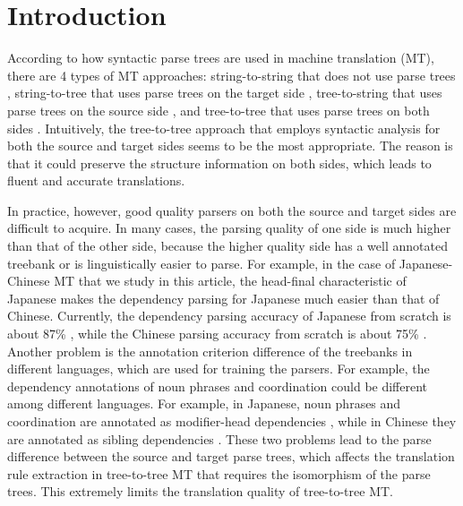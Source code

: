 \documentclass[english]{jnlp_1.4}
\begin{document}
\maketitle

\vspace*{-1.5\Cvs}
\section{Introduction}

According to how syntactic parse trees are used in machine translation (MT), there are 4 types of
MT approaches: string-to-string that does not use parse trees \cite{chiang:2005:ACL,koehn-EtAl:2007:PosterDemo}, 
string-to-tree that uses parse trees on the target side \cite{galley-EtAl:2006:COLACL,shen-xu-weischedel:2008:ACLMain},
tree-to-string that uses parse trees on the source side 
\cite{quirk-menezes-cherry:2005:ACL,liu-liu-lin:2006:COLACL,mi-huang:2008:EMNLP},
and tree-to-tree that uses parse trees on both sides \cite{zhang-EtAl:2008:ACLMain3,richardson-EtAl:2015:WAT}.
Intuitively, the tree-to-tree approach that employs syntactic analysis for both the source 
and target sides seems to be the most appropriate. The reason is that it could preserve 
the structure information on both sides, 
\pagebreak
which leads to fluent and accurate translations.

In practice, however, good quality parsers on both the source and target sides are difficult to 
acquire. In many cases, the parsing quality of one side is much higher than that of the other 
side, because the higher quality side has a well annotated treebank or is linguistically easier to parse. 
For example, in the case of Japanese-Chinese MT that we study in this article, 
the head-final characteristic of Japanese \cite{isozaki-EtAl:2010:WMT} makes the dependency
parsing for Japanese much easier than that of Chinese. Currently, the dependency 
parsing accuracy of Japanese {from scratch is about 87\%} \cite{kawahara-kurohashi:2006:HLT-NAACL06-Main},
while the Chinese parsing accuracy {from scratch is about 75\% \cite{hatori-EtAl:2012:ACL2012}}.
Another problem is the annotation criterion difference of the treebanks in different languages, 
which are used for training the parsers. For example, the dependency annotations
of noun phrases and coordination could be different among different languages. For example,
in Japanese, noun phrases and coordination are annotated as modifier-head dependencies
\cite{kawahara-kurohashi:2006:HLT-NAACL06-Main}, while in Chinese they are annotated as 
sibling dependencies \cite{shen-kawahara-kurohashi:2012:PACLIC}. These two problems lead to the
parse difference between the source and target parse trees, which affects the translation
rule extraction in tree-to-tree MT that requires the isomorphism of the parse trees.
This extremely limits the translation quality of tree-to-tree MT.
\end{document}
